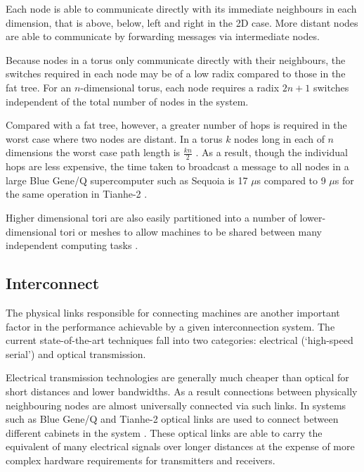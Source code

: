 				Each node is able to communicate directly with its immediate neighbours
				in each dimension, that is above, below, left and right in the 2D case.
				More distant nodes are able to communicate by forwarding messages via
				intermediate nodes.
				
				Because nodes in a torus only communicate directly with their
				neighbours, the switches required in each node may be of a low radix
				compared to those in the fat tree. For an $n$-dimensional torus, each
				node requires a radix $2n+1$ switches independent of the total number of
				nodes in the system.
				
				Compared with a fat tree, however, a greater number of hops is required
				in the worst case where two nodes are distant. In a torus $k$ nodes long
				in each of $n$ dimensions the worst case path length is $\frac{kn}{2}$
				\cite{dally04}. As a result, though the individual hops are less
				expensive, the time taken to broadcast a message to all nodes in a large
				Blue Gene/Q supercomputer such as Sequoia is 17 $\mu$s compared to 9
				$\mu$s for the same operation in Tianhe-2 \cite{morozov12}.
				
				Higher dimensional tori are also easily partitioned into a number of
				lower-dimensional tori or meshes to allow machines to be shared between
				many independent computing tasks \cite{yokokawa11,chen11}.
		
		\subsection{Interconnect}
			
			
			The physical links responsible for connecting machines are another
			important factor in the performance achievable by a given interconnection
			system. The current state-of-the-art techniques fall into two categories:
			electrical (`high-speed serial') and optical transmission.
			
			Electrical transmission technologies are generally much cheaper than
			optical for short distances and lower bandwidths. As a result connections
			between physically neighbouring nodes are almost universally connected via
			such links. In systems such as Blue Gene/Q and Tianhe-2 optical links are
			used to connect between different cabinets in the system
			\cite{dongarra13,prickett10}. These optical links are able to carry the
			equivalent of many electrical signals over longer distances at the expense
			of more complex hardware requirements for transmitters and receivers.
			
